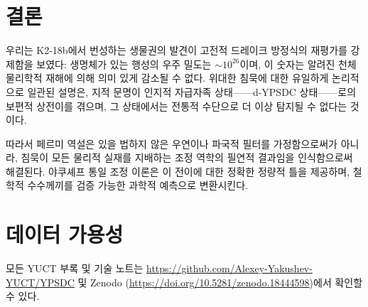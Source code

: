 \documentclass[11pt,a4paper]{article}
\begin{document}
	\section{결론}
	\label{sec:conclusions}
	우리는 K2-18b에서 번성하는 생물권의 발견이 고전적 드레이크 방정식의 재평가를 강제함을 보였다: 생명체가 있는 행성의 우주 밀도는 \(\sim 10^{26}\)이며, 이 숫자는 알려진 천체물리학적 재해에 의해 의미 있게 감소될 수 없다. 위대한 침묵에 대한 유일하게 논리적으로 일관된 설명은, 지적 문명이 인지적 자급자족 상태——d-YPSDC 상태——로의 보편적 상전이를 겪으며, 그 상태에서는 전통적 수단으로 더 이상 탐지될 수 없다는 것이다.
	
	따라서 페르미 역설은 있을 법하지 않은 우연이나 파국적 필터를 가정함으로써가 아니라, 침묵이 모든 물리적 실재를 지배하는 조정 역학의 필연적 결과임을 인식함으로써 해결된다. 야쿠셰프 통일 조정 이론은 이 전이에 대한 정확한 정량적 틀을 제공하며, 철학적 수수께끼를 검증 가능한 과학적 예측으로 변환시킨다.
	
	\section*{데이터 가용성}
	모든 YUCT 부록 및 기술 노트는 \url{https://github.com/Alexey-Yakushev-YUCT/YPSDC} 및 Zenodo (\url{https://doi.org/10.5281/zenodo.18444598})에서 확인할 수 있다.
	
\end{document}
